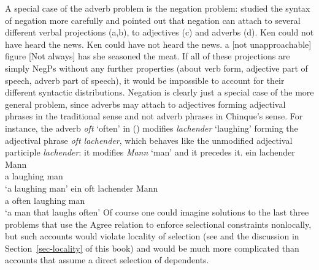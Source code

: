 A special case of the adverb problem is the negation
problem: \citet{Ernst92a} studied the syntax of negation more carefully and pointed out that
negation can attach to several different verbal projections (a,b), to adjectives (c)
and adverbs (d).
\eal
\ex Ken could not have heard the news.
\ex Ken could have not heard the news.
\ex a [not unapproachable] figure
\ex {}[Not always] has she seasoned the meat.
\zl
\addlines
If all of these projections are simply NegPs without any further properties (about verb form, adjective
part of speech, adverb part of speech), it would be impossible to account for their different
syntactic distributions. Negation is clearly just a special case of the more general problem, since
adverbs may attach to adjectives forming adjectival phrases in the traditional sense and not adverb
phrases in Chinque's sense. For instance, the adverb \emph{oft} `often' in () modifies
\emph{lachender} `laughing' forming the adjectival phrase \emph{oft lachender}, which behaves like the
unmodified adjectival participle \emph{lachender}: it modifies \emph{Mann} `man' and it precedes it.
\eal
\ex
\gll ein lachender Mann\\
     a   laughing man\\
\glt `a laughing man'
\ex
\gll ein oft lachender Mann\\
     a   often laughing man\\
\glt `a man that laughs often'
\zl     
Of course one could imagine solutions to the last three problems that use the Agree relation to enforce selectional
constraints nonlocally, but such accounts would violate locality of selection (see \citealp[]{Ernst92a} and the discussion in
Section~\ref{sec-locality} of this book) and would be much more complicated than accounts
that assume a direct selection of dependents.


